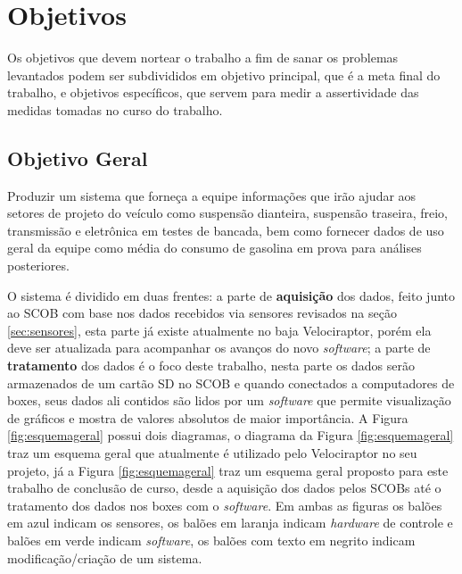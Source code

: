 \section{Objetivos}
\label{sec:objetivos}
Os objetivos que devem nortear o trabalho a fim de sanar os problemas levantados podem ser subdivididos em objetivo principal, que é a meta final do trabalho, e objetivos específicos, que servem para medir a assertividade das medidas tomadas no curso do trabalho.

\subsection{Objetivo Geral}

Produzir um sistema que forneça a equipe informações que irão ajudar aos setores de projeto do veículo como suspensão dianteira, suspensão traseira, freio, transmissão e eletrônica em testes de bancada, bem como fornecer dados de uso geral da equipe como média do consumo de gasolina em prova para análises posteriores. 

O sistema é dividido em duas frentes: a parte de \textbf{aquisição} dos dados, feito junto ao SCOB com base nos dados recebidos via sensores revisados na seção \ref{sec:sensores}, esta parte já existe atualmente no baja Velociraptor, porém ela deve ser atualizada para acompanhar os avanços do novo \textit{software}; a parte de \textbf{tratamento} dos dados é o foco deste trabalho, nesta parte os dados serão armazenados de um cartão SD no SCOB e quando conectados a computadores de boxes, seus dados ali contidos são lidos por um \textit{software} que permite visualização de gráficos e mostra de valores absolutos de maior importância. A Figura \ref{fig:esquemageral} possui dois diagramas, o diagrama da Figura \ref{fig:esquemageral} traz um esquema geral que atualmente é utilizado pelo Velociraptor no seu projeto, já a Figura \ref{fig:esquemageral} traz um esquema geral proposto para este trabalho de conclusão de curso, desde a aquisição dos dados pelos SCOBs até o tratamento dos dados nos boxes com o \textit{software}. Em ambas as figuras os balões em azul indicam os sensores, os balões em laranja indicam \textit{hardware} de controle e balões em verde indicam \textit{software}, os balões com texto em negrito indicam modificação/criação de um sistema.         


